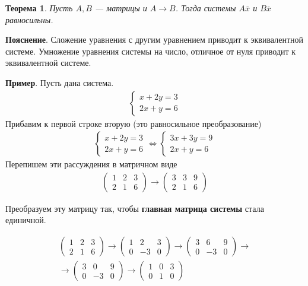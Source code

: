 \documentclass[]{article}
\newtheorem{thr}{Теорема}
\begin{document}
\begin{thr}
	Пусть $A,B$ --- матрицы и $A\rightarrow B$. Тогда системы $A\overline{x}$ и $B\overline{x}$ равносильны.
\end{thr}

\textbf{Пояснение}. Сложение уравнения с другим уравнением приводит к эквивалентной системе. Умножение уравнения системы на число, отличное от нуля приводит к эквивалентной системе.

\textbf{Пример}. Пусть дана система. 
\begin{gather*}
	\begin{cases}
		x+2y=3
		\\
		2x+y=6
	\end{cases}
\end{gather*}
Прибавим к первой строке вторую (это равносильное преобразование)
\begin{gather*}
	\begin{cases}
		x+2y=3
		\\
		2x+y=6
	\end{cases}
	\Leftrightarrow 
	\begin{cases}
		3x+3y=9
		\\
		2x+y=6
	\end{cases}
\end{gather*}
Перепишем эти рассуждения в матричном виде
\begin{gather*}
	\left(
	\begin{array}{ll|l}
		1 & 2 & 3
		\\
		2 & 1 & 6
	\end{array}
	\right)
	\rightarrow
	\left(
	\begin{array}{ll|l}
		3 & 3 & 9
		\\
		2 & 1 & 6
	\end{array}
	\right)
\end{gather*}

Преобразуем эту матрицу так, чтобы \textbf{главная матрица системы} стала единичной.

\begin{gather*}
	\left(
	\begin{array}{ll|l}
		1 & 2 & 3
		\\
		2 & 1 & 6
	\end{array}
	\right)
	\rightarrow
	\left(
\begin{array}{ll|l}
	1 & 2 & 3
	\\
	0 & -3 & 0
\end{array}
\right)
\rightarrow
	\left(
\begin{array}{ll|l}
	3 & 6 & 9
	\\
	0 & -3 & 0
\end{array}
\right)
\rightarrow
\\
\rightarrow
\left(
\begin{array}{ll|l}
	3 & 0 & 9
	\\
	0 & -3 & 0
\end{array}
\right)
\rightarrow
\left(
\begin{array}{ll|l}
	1 & 0 & 3
	\\
	0 & 1 & 0
\end{array}
\right)
\end{gather*}
\end{document}
